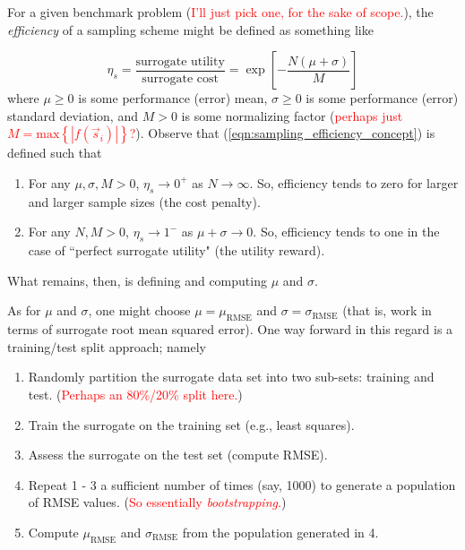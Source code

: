 \documentclass[12pt, letterpaper]{report}
\theoremstyle{definition}
\begin{document}
\noindent For a given benchmark problem (\textcolor{red}{I'll just pick one, for the sake of scope.}), the \textit{efficiency} of a sampling scheme might be defined as something like

\begin{equation}
	\eta_s = \frac{\textrm{surrogate utility}}{\textrm{surrogate cost}} = \exp\left[-\frac{N(\mu + \sigma)}{M}\right]
	\label{eqn:sampling_efficiency_concept}
\end{equation}
\noindent where $\mu\geq 0$ is some performance (error) mean, $\sigma\geq 0$ is some performance (error) standard deviation, and $M>0$ is some normalizing factor (\textcolor{red}{perhaps just $M = \textrm{max}\left\{|f(\vec{s}_i)|\right\}$?}). Observe that (\ref{eqn:sampling_efficiency_concept}) is defined such that

\begin{enumerate}
	\item For any $\mu, \sigma, M > 0$, $\eta_s\to 0^+$ as $N\to\infty$. So, efficiency tends to zero for larger and larger sample sizes (the cost penalty).
	\item For any $N,M>0$, $\eta_s\to 1^-$ as $\mu + \sigma \to 0$. So, efficiency tends to one in the case of ``perfect surrogate utility" (the utility reward).
\end{enumerate}

\noindent What remains, then, is defining and computing $\mu$ and $\sigma$.\par 
As for $\mu$ and $\sigma$, one might choose $\mu = \mu_\textrm{RMSE}$ and $\sigma = \sigma_\textrm{RMSE}$ (that is, work in terms of surrogate root mean squared error). One way forward in this regard is a training/test split approach; namely

\begin{enumerate}
	\item Randomly partition the surrogate data set into two sub-sets: training and test. (\textcolor{red}{Perhaps an 80\%/20\% split here.})
	\item Train the surrogate on the training set (e.g., least squares).
	\item Assess the surrogate on the test set (compute RMSE).
	\item Repeat 1 - 3 a sufficient number of times (say, 1000) to generate a population of RMSE values. (\textcolor{red}{So essentially \textit{bootstrapping}.})
	\item Compute $\mu_\textrm{RMSE}$ and $\sigma_\textrm{RMSE}$ from the population generated in 4.
\end{enumerate}
\end{document}
